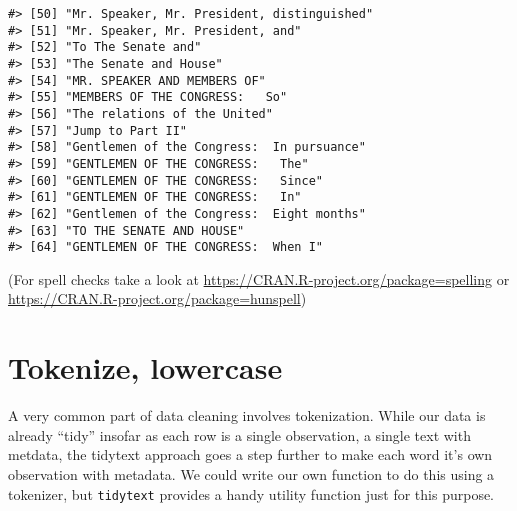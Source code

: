 \documentclass[]{book}
\newenvironment{Shaded}{\begin{snugshade}}{\end{snugshade}}
\newcommand{\KeywordTok}[1]{\textcolor[rgb]{0.13,0.29,0.53}{\textbf{#1}}}
\newcommand{\NormalTok}[1]{#1}
\newcommand{\OperatorTok}[1]{\textcolor[rgb]{0.81,0.36,0.00}{\textbf{#1}}}
\newcommand{\StringTok}[1]{\textcolor[rgb]{0.31,0.60,0.02}{#1}}
\begin{document}
\begin{verbatim}
#> [50] "Mr. Speaker, Mr. President, distinguished"
#> [51] "Mr. Speaker, Mr. President, and"          
#> [52] "To The Senate and"                        
#> [53] "The Senate and House"                     
#> [54] "MR. SPEAKER AND MEMBERS OF"               
#> [55] "MEMBERS OF THE CONGRESS:   So"            
#> [56] "The relations of the United"              
#> [57] "Jump to Part II"                          
#> [58] "Gentlemen of the Congress:  In pursuance" 
#> [59] "GENTLEMEN OF THE CONGRESS:   The"         
#> [60] "GENTLEMEN OF THE CONGRESS:   Since"       
#> [61] "GENTLEMEN OF THE CONGRESS:   In"          
#> [62] "Gentlemen of the Congress:  Eight months" 
#> [63] "TO THE SENATE AND HOUSE"                  
#> [64] "GENTLEMEN OF THE CONGRESS:  When I"
\end{verbatim}

(For spell checks take a look at \url{https://CRAN.R-project.org/package=spelling} or \url{https://CRAN.R-project.org/package=hunspell})

\hypertarget{tokenize-lowercase}{%
\section{Tokenize, lowercase}\label{tokenize-lowercase}}

A very common part of data cleaning involves tokenization. While our data is already ``tidy'' insofar as each row is a single observation, a single text with metdata, the tidytext approach goes a step further to make each word it's own observation with metadata. We could write our own function to do this using a tokenizer, but \texttt{tidytext} provides a handy utility function just for this purpose.

\begin{Shaded}
\end{Shaded}
\end{document}

